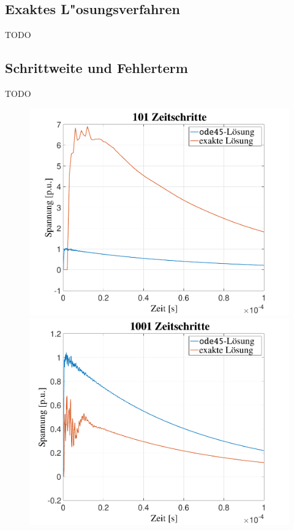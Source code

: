 \begin{refsection}
\subsection{Exaktes L"osungsverfahren}
\color{red}TODO\color{black}

\subsection{Schrittweite und Fehlerterm}
\color{red}TODO\color{black}

	\begin{figure}
	    \centering
	    \begin{minipage}{.32\textwidth}
	        \centering
	        \includegraphics[width=\linewidth]{./Trafo/images/Sprung101.pdf}
	    \end{minipage}%
	    \begin{minipage}{.32\textwidth}
	        \centering
	        \includegraphics[width=\linewidth]{./Trafo/images/Sprung1001.pdf}

\end{minipage}
\end{figure}
\end{refsection}

